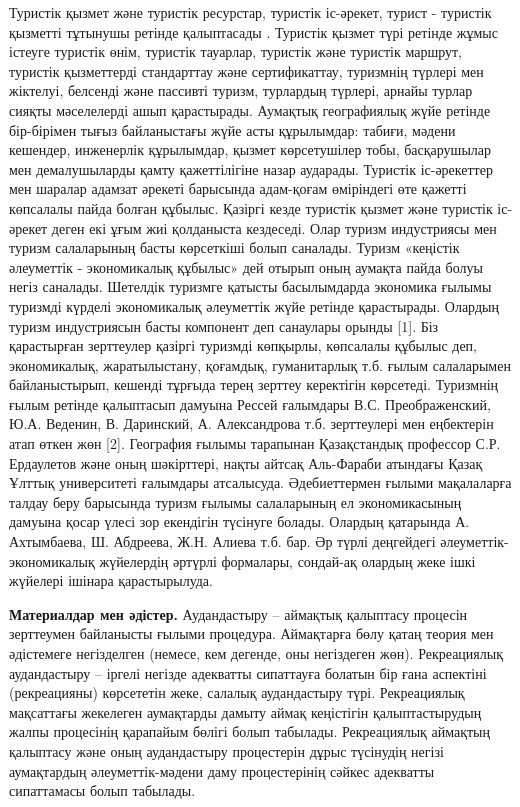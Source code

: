 \begin{multicols}{2}
Туристік қызмет және туристік ресурстар, туристік іс-әрекет, турист -
туристік қызметті тұтынушы ретінде қалыптасады . Туристік қызмет түрі
ретінде жұмыс істеуге туристік өнім, туристік тауарлар, туристік және
туристік маршрут, туристік қызметтерді стандарттау және сертификаттау,
туризмнің түрлері мен жіктелуі, белсенді және пассивті туризм, турлардың
түрлері, арнайы турлар сияқты мәселелерді ашып қарастырады. Аумақтық
географиялық жүйе ретінде бір-бірімен тығыз байланыстағы жүйе асты
құрылымдар: табиғи, мәдени кешендер, инженерлік құрылымдар, қызмет
көрсетушілер тобы, басқарушылар мен демалушыларды қамту қажеттілігіне
назар аударады. Туристік іс-әрекеттер мен шаралар адамзат әрекеті
барысында адам-қоғам өміріндегі өте қажетті көпсалалы пайда болған
құбылыс. Қазіргі кезде туристік қызмет және туристік іс-әрекет деген екі
ұғым жиі қолданыста кездеседі. Олар туризм индустриясы мен туризм
салаларының басты көрсеткіші болып саналады. Туризм «кеңістік әлеуметтік
- экономикалық құбылыс» дей отырып оның аумақта пайда болуы негіз
саналады. Шетелдік туризмге қатысты басылымдарда экономика ғылымы
туризмді күрделі экономикалық әлеуметтік жүйе ретінде қарастырады.
Олардың туризм индустриясын басты компонент деп санаулары орынды
{[}1{]}. Біз қарастырған зерттеулер қазіргі туризмді көпқырлы, көпсалалы
құбылыс деп, экономикалық, жаратылыстану, қоғамдық, гуманитарлық т.б.
ғылым салаларымен байланыстырып, кешенді тұрғыда терең зерттеу
керектігін көрсетеді. Туризмнің ғылым ретінде қалыптасып дамуына Рессей
ғалымдары В.С. Преображенский, Ю.А. Веденин, В. Даринский, А.
Александрова т.б. зерттеулері мен еңбектерін атап өткен жөн {[}2{]}.
География ғылымы тарапынан Қазақстандық профессор С.Р. Ердаулетов және
оның шәкірттері, нақты айтсақ Аль-Фараби атындағы Қазақ Ұлттық
университеті ғалымдары атсалысуда. Әдебиеттермен ғылыми мақалаларға
талдау беру барысында туризм ғылымы салаларының ел экономикасының
дамуына қосар үлесі зор екендігін түсінуге болады. Олардың қатарында А.
Ахтымбаева, Ш. Абдреева, Ж.Н. Алиева т.б. бар. Әр түрлі деңгейдегі
әлеуметтік-экономикалық жүйелердің әртүрлі формалары, сондай-ақ олардың
жеке ішкі жүйелері ішінара қарастырылуда.

{\bfseries Материалдар мен әдістер.} Аудандастыру -- аймақтық қалыптасу
процесін зерттеумен байланысты ғылыми процедура. Аймақтарға бөлу қатаң
теория мен әдістемеге негізделген (немесе, кем дегенде, оны негіздеген
жөн). Рекреациялық аудандастыру -- іргелі негізде адекватты сипаттауға
болатын бір ғана аспектіні (рекреацияны) көрсететін жеке, салалық
аудандастыру түрі. Рекреациялық мақсаттағы жекелеген аумақтарды дамыту
аймақ кеңістігін қалыптастырудың жалпы процесінің қарапайым бөлігі болып
табылады. Рекреациялық аймақтың қалыптасу және оның аудандастыру
процестерін дұрыс түсінудің негізі аумақтардың әлеуметтік-мәдени даму
процестерінің сәйкес адекватты сипаттамасы болып табылады.


\end{multicols}
